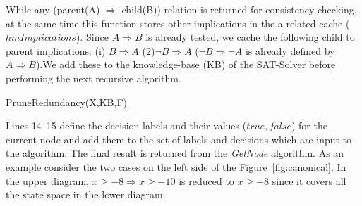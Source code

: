 \documentclass[twoside,11pt]{article}
\begin{document}
While any (parent(A) $\Rightarrow$ child(B)) relation is returned for consistency checking, at the same time this function stores other implications in the a related cache ($\mathit{hmImplications}$). Since $A \Rightarrow B$ is already tested, we cache the following child to parent implications: (i) $B \Rightarrow A$ (2)$\neg B \Rightarrow A$ ($\neg B \Rightarrow \neg A$ is already defined by $A \Rightarrow B$).We add these to the knowledge-base (KB) of the SAT-Solver before performing the next recursive algorithm. 

\incmargin{1em}
\linesnumbered
\begin{algorithm}[t!]
\BlankLine
{}
\caption{{\sc PruneRedundancy}(X,KB,F)  \label{algRedundant}}
\end{algorithm}
\decmargin{1em}
Lines 14--15 define the decision labels and their values ($\mathit{true,false}$) for the current node and add them to the set of labels and decisions which are input to the algorithm. The final result is returned from the \emph{GetNode} algorithm. As an example consider the two cases on the left side of the Figure~\ref{fig:canonical}. In the upper diagram,  $x \geq -8  \Rightarrow x \geq -10 $ is reduced to $x\geq-8$ since it covers all the state space in the lower diagram.   
\end{document}
